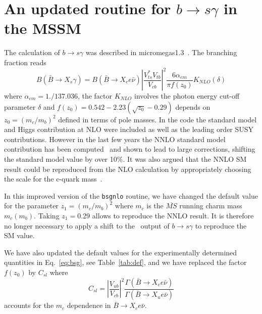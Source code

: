 \documentclass[12pt,a4paper]{article}
\begin{document}
\section{An updated routine for $b\rightarrow s\gamma$ in the MSSM}
The calculation of $b\rightarrow s\gamma$ was described in micromegas1.3~\cite{Belanger:2004yn}. 
The branching fraction reads
\begin{equation}
B(\bar{B}\rightarrow X_s \gamma) =B(\bar{B}\rightarrow X_c e\bar\nu) \left|\frac{V_{ts}^* V_{tb}}
{V_{cb}}\right|^2 \frac{6\alpha_{em}}{\pi f(z_0)} K_{NLO}(\delta)
\label{eq:bsg}
\end{equation}
where $\alpha_{em}=1./137.036$, the factor $K_{NLO}$ involves the photon energy cut-off parameter
$\delta$ and $f(z_0)=0.542-2.23(\sqrt{z_0} -0.29)$ depends on $z_0=(m_c/m_b)^2$ defined in terms of pole
masses.  
In the code 
the standard model and Higgs contribution at NLO were included as well as the leading order SUSY
contributions. However in the last few years
 the NNLO standard model contribution has been computed~\cite{Misiak:2006zs} and shown to lead to large corrections, shifting
 the standard model value by over 10\%. 
 It was also argued that the NNLO SM result could be reproduced from
 the NLO calculation by appropriately choosing the scale for the c-quark mass~\cite{Misiak:2006ab,Gambino:2008fj}. 



 In this improved version of the {\tt bsgnlo} routine, we 
 have changed the default value for the parameter $z_1=(m_c/m_b)^2$
 where $m_c$ is the $\overline{MS}$ running charm mass $m_c(m_b)$. Taking $z_1=0.29$ allows 
 to reproduce the NNLO result. 
 It is therefore no longer necessary to apply a shift to  the \micro\ output of $b\rightarrow s\gamma$
 to reproduce the SM value. 


We have also updated the default values for the experimentally determined quantities in
Eq.~\ref{eq:bsg}, see Table~\ref{tab:def}, and we have replaced the factor $f(z_0)$ by $C_{sl}$ where
\begin{equation}
C_{sl}=\left|\frac{V_{ub}}{V_{cb}}\right|^2 \frac{\Gamma(\bar{B}\rightarrow X_c e\bar\nu)}{\Gamma(\bar{B}\rightarrow X_u e\bar\nu)}
\end{equation}
accounts for the $m_c$ dependence in $\bar{B}\rightarrow X_c e\bar\nu$.
\end{document}
